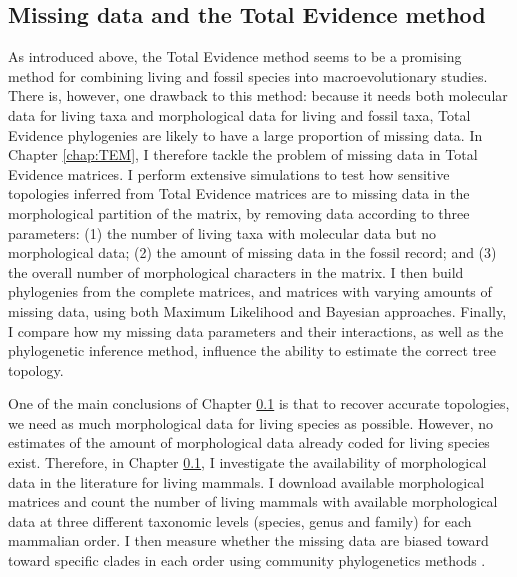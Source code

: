 \subsection{Missing data and the Total Evidence method}
As introduced above, the Total Evidence method seems to be a promising method for combining living and fossil species into macroevolutionary studies.
There is, however, one drawback to this method: because it needs both molecular data for living taxa and morphological data for living and fossil taxa, Total Evidence phylogenies are likely to have a large proportion of missing data.
In Chapter \ref{chap:TEM}, I therefore tackle the problem of missing data in Total Evidence matrices.
I perform extensive simulations to test how sensitive topologies inferred from Total Evidence matrices are to missing data in the morphological partition of the matrix, by removing data according to three parameters: (1) the number of living taxa with molecular data but no morphological data; (2) the amount of missing data in the fossil record; and (3) the overall number of morphological characters in the matrix.
I then build phylogenies from the complete matrices, and matrices with varying amounts of missing data, using both Maximum Likelihood and Bayesian approaches.
Finally, I compare how my missing data parameters and their interactions, as well as the phylogenetic inference method, influence the ability to estimate the correct tree topology.


One of the main conclusions of Chapter \ref{} is that to recover accurate topologies, we need as much morphological data for living species as possible.
However, no estimates of the amount of morphological data already coded for living species exist.
Therefore, in Chapter \ref{}, I investigate the availability of morphological data in the literature for living mammals.
I download available morphological matrices and count the number of living mammals with available morphological data at three different taxonomic levels (species, genus and family) for each mammalian order.
I then measure whether the missing data are biased toward toward specific clades in each order using community phylogenetics methods \citep{webb2002phylogenies}.

